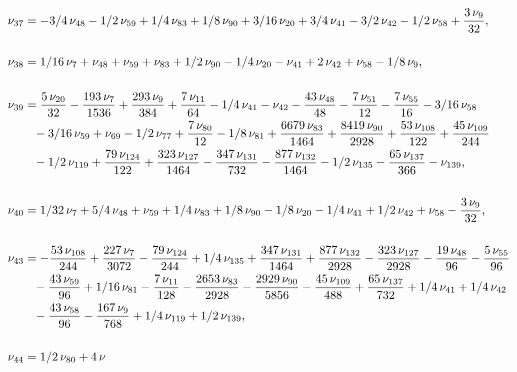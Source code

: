 \documentclass[a4paper,12pt, DIV=14, BCOR=5mm, twoside, headsepline]{scrbook}
\begin{document}
\begin{align}\label{AreaSol5}
\begin{aligned}
\nu_
{{37}}&=-3/4\,\nu_{{48}}-1/2\,\nu_{{59}}+1/4\,\nu_{{83}}+1/8\,\nu_{{90}
}+3/16\,\nu_{{20}}+3/4\,\nu_{{41}}-3/2\,\nu_{{42}}-1/2\,\nu_{{58}}+{
\frac {3\,\nu_{{9}}}{32}}, \\
\\
\nu_{{38}}&=1/16\,\nu_{{7}}+\nu_{{48}}+\nu_{{
59}}+\nu_{{83}}+1/2\,\nu_{{90}}-1/4\,\nu_{{20}}-\nu_{{41}}+2\,\nu_{{42
}}+\nu_{{58}}-1/8\,\nu_{{9}}, \\
\\
\nu_{{39}}&={\frac {5\,\nu_{{20}}}{32}}-{
\frac {193\,\nu_{{7}}}{1536}}+{\frac {293\,\nu_{{9}}}{384}}+{\frac {7
\,\nu_{{11}}}{64}}-1/4\,\nu_{{41}}-\nu_{{42}}-{\frac {43\,\nu_{{48}}}{
48}}-{\frac {7\,\nu_{{51}}}{12}}-{\frac {7\,\nu_{{55}}}{16}}-3/16\,\nu
_{{58}}\\
 &\hphantom{=}-3/16\,\nu_{{59}}+\nu_{{69}}-1/2\,\nu_{{77}}+{\frac {7\,\nu_{{
80}}}{12}}-1/8\,\nu_{{81}}+{\frac {6679\,\nu_{{83}}}{1464}}+{\frac {
8419\,\nu_{{90}}}{2928}}+{\frac {53\,\nu_{{108}}}{122}}+{\frac {45\,
\nu_{{109}}}{244}}\\
 &\hphantom{=}-1/2\,\nu_{{119}}+{\frac {79\,\nu_{{124}}}{122}}+{
\frac {323\,\nu_{{127}}}{1464}}-{\frac {347\,\nu_{{131}}}{732}}-{
\frac {877\,\nu_{{132}}}{1464}}-1/2\,\nu_{{135}}-{\frac {65\,\nu_{{137
}}}{366}}-\nu_{{139}}, \\
\\
\nu_{{40}}&=1/32\,\nu_{{7}}+5/4\,\nu_{{48}}+\nu_{
{59}}+1/4\,\nu_{{83}}+1/8\,\nu_{{90}}-1/8\,\nu_{{20}}-1/4\,\nu_{{41}}+
1/2\,\nu_{{42}}+\nu_{{58}}-{\frac {3\,\nu_{{9}}}{32}}, \\
\\
\nu_{{43}}&=-{
\frac {53\,\nu_{{108}}}{244}}+{\frac {227\,\nu_{{7}}}{3072}}-{\frac {
79\,\nu_{{124}}}{244}}+1/4\,\nu_{{135}}+{\frac {347\,\nu_{{131}}}{1464
}}+{\frac {877\,\nu_{{132}}}{2928}}-{\frac {323\,\nu_{{127}}}{2928}}-{
\frac {19\,\nu_{{48}}}{96}}-{\frac {5\,\nu_{{55}}}{96}}\\
 &\hphantom{=}-{\frac {43\,
\nu_{{59}}}{96}}+1/16\,\nu_{{81}}-{\frac {7\,\nu_{{11}}}{128}}-{\frac 
{2653\,\nu_{{83}}}{2928}}-{\frac {2929\,\nu_{{90}}}{5856}}-{\frac {45
\,\nu_{{109}}}{488}}+{\frac {65\,\nu_{{137}}}{732}}+1/4\,\nu_{{41}}+1/
4\,\nu_{{42}}\\
 &\hphantom{=}-{\frac {43\,\nu_{{58}}}{96}}-{\frac {167\,\nu_{{9}}}{768
}}+1/4\,\nu_{{119}}+1/2\,\nu_{{139}},\\
\\
\nu_{{44}}&=1/2\,\nu_{{80}}+4\,\nu

\end{aligned}
\end{align}
\end{document}
